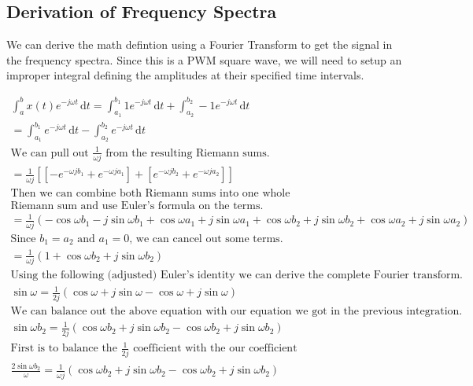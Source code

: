 \documentclass{article}
\begin{document}
\newpage

\subsection{Derivation of Frequency Spectra}

We can derive the math defintion using a Fourier Transform to get the signal in the frequency spectra.
Since this is a PWM square wave, we will need to setup an improper integral defining the amplitudes at
their specified time intervals. 

\begin{gather*}
\int_a^b \! x(t)e^{-j\omega{t}} \, \mathrm{d}t = \int_{a_1}^{b_1} \! 1e^{-j\omega{t}} \, \mathrm{d}t + \int_{a_2}^{b_2} \! -1e^{-j\omega{t}} \, \mathrm{d}t \\
= \int_{a_1}^{b_1} \! e^{-j\omega{t}} \, \mathrm{d}t - \int_{a_2}^{b_2} \! e^{-j\omega{t}} \, \mathrm{d}t \\
\text{We can pull out $\frac{1}{\omega{j}}$ from the resulting Riemann sums.} \\
= \frac{1}{\omega{j}}[[-e^{-\omega{jb_{1}}}+e^{-\omega{ja_{1}}}]+[e^{-\omega{jb_{2}}}+e^{-\omega{ja_{2}}}]] \\
\text{Then we can combine both Riemann sums into one whole} \\
\text{Riemann sum and use Euler's formula on the terms.} \\
= \frac{1}{\omega{j}}(-\cos{\omega{b_1}}-j\sin{\omega{b_1}}+\cos{\omega{a_1}}+j\sin{\omega{a_1}}+\cos{\omega{b_2}}+j\sin{\omega{b_2}}+\cos{\omega{a_2}}+j\sin{\omega{a_2}}) \\
\text{Since $b_1=a_2$ and $a_1=0$, we can cancel out some terms.} \\
= \frac{1}{\omega{j}}(1+\cos{\omega{b_2}}+j\sin{\omega{b_2}}) \\
\text{Using the following (adjusted) Euler's identity we can derive the complete Fourier transform.} \\
\sin{\omega} = \frac{1}{2j}(\cos{\omega}+j\sin{\omega}-\cos{\omega}+j\sin{\omega}) \\
\text{We can balance out the above equation with our equation we got in the previous integration.} \\
\sin{\omega{b_2}} = \frac{1}{2j}(\cos{\omega{b_2}}+j\sin{\omega{b_2}}-\cos{\omega{b_2}}+j\sin{\omega{b_2}}) \\
\text{First is to balance the $\frac{1}{2j}$ coefficient with the our coefficient} \\
\frac{2\sin{\omega{b_2}}}{\omega} = \frac{1}{\omega{j}}(\cos{\omega{b_2}}+j\sin{\omega{b_2}}-\cos{\omega{b_2}}+j\sin{\omega{b_2}}) \\

\end{gather*}
\end{document}
